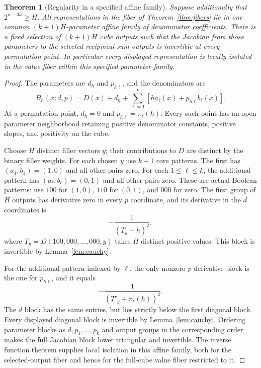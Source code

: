 \documentclass[11pt]{article}
\newtheorem{theorem}{Theorem}
\begin{document}
\begin{theorem}[Regularity in a specified affine family]\label{thm:regular}
Suppose additionally that $2^{n-3k}\geq H$. All representations in
the fiber of Theorem~\ref{thm:fibers} lie in one common
$(k+1)H$-parameter affine family of denominator coefficients.
There is a fixed selection of $(k+1)H$ cube outputs such that the
Jacobian from those parameters to the selected reciprocal-sum
outputs is invertible at every permutation point. In particular
every displayed representation is locally isolated in the value
fiber within this specified parameter family.
\end{theorem}
\begin{proof}
The parameters are $d_h$ and $p_{h\ell}$, and the denominators are
\[
 B_h(x;d,p)=D(x)+d_h+
     \sum_{\ell=1}^k[h a_\ell(x)+p_{h\ell}b_\ell(x)].
\]
At a permutation point, $d_h=0$ and $p_{h\ell}=\pi_\ell(h)$.
Every such point has an open parameter neighborhood retaining
positive denominator constants, positive slopes, and positivity
on the cube.

Choose $H$ distinct filler vectors $y$; their contributions to $D$
are distinct by the binary filler weights. For each chosen $y$
use $k+1$ core patterns. The first has
$(a_1,b_1)=(1,0)$ and all other pairs zero. For each
$1\leq\ell\leq k$, the additional pattern has
$(a_\ell,b_\ell)=(0,1)$ and all other pairs zero. These are
actual Boolean patterns: use $100$ for $(1,0)$, $110$ for
$(0,1)$, and $000$ for zero. The first group of $H$ outputs
has derivative zero in every $p$ coordinate, and its derivative
in the $d$ coordinates is
\[
 -\frac{1}{(T_y+h)^2},
\]
where $T_y=D(100,000,\ldots,000,y)$ takes $H$ distinct positive
values. This block is invertible by Lemma~\ref{lem:cauchy}.

For the additional pattern indexed by $\ell$, the only nonzero
$p$ derivative block is the one for $p_{h\ell}$, and it equals
\[
 -\frac{1}{(T'_y+\pi_\ell(h))^2}.
\]
The $d$ block has the same entries, but lies strictly below the
first diagonal block. Every displayed diagonal block is
invertible by Lemma~\ref{lem:cauchy}. Ordering parameter blocks
as $d,p_1,\ldots,p_k$ and output groups in the corresponding
order makes the full Jacobian block lower triangular and
invertible. The inverse function theorem supplies local
isolation in this affine family, both for the selected-output
fiber and hence for the full-cube value fiber restricted to it.
\end{proof}
\end{document}
